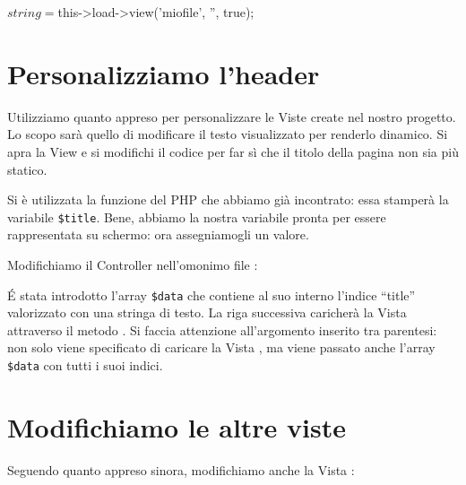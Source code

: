 \begin{code}
$string = $this->load->view('miofile', '', true);
\end{code}

\section{Personalizziamo l'header}
Utilizziamo quanto appreso per personalizzare le Viste create nel nostro progetto. Lo scopo sarà quello di modificare il testo visualizzato per renderlo dinamico. Si apra la View  e si modifichi il codice per far sì che il titolo della pagina non sia più statico.


Si è utilizzata la funzione  del \ac{PHP} che abbiamo già incontrato: essa stamperà la variabile \verb|$title|. Bene, abbiamo la nostra variabile pronta per essere rappresentata su schermo: ora assegniamogli un valore.

Modifichiamo il Controller  nell'omonimo file :


\'E stata introdotto l'array \verb|$data| che contiene al suo interno l'indice ``title'' valorizzato con una stringa di testo. La riga successiva caricherà la Vista attraverso il metodo . Si faccia attenzione all'argomento inserito tra parentesi: non solo viene specificato di caricare la Vista , ma viene passato anche l'array \verb|$data| con tutti i suoi indici.

\section*{Modifichiamo le altre viste}
Seguendo quanto appreso sinora, modifichiamo anche la Vista :


